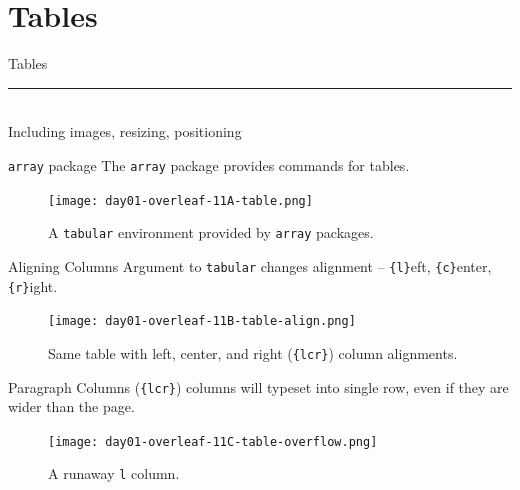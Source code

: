 \documentclass{beamer}
\begin{document}
{  

  \section{Tables}

  \begin{frame}[plain]
    \vfill
    \centering
    \begin{beamercolorbox}[sep=8pt,center,shadow=true,rounded=true]{Tables}
      \insertsectionhead\par%
      \color{davisblue}\noindent\rule{10cm}{1pt} \\
      \footnotesize{Including images, resizing, positioning}
    \end{beamercolorbox}
    \vfill
  \end{frame}

  \begin{frame}{\texttt{array} package}
    The \texttt{array} package provides commands for tables.
    \begin{figure}
      \texttt{[image: day01-overleaf-11A-table.png]}
      \caption{A \texttt{tabular} environment provided by \texttt{array} packages.}
      \label{fig:day01-overleaf-11A}
    \end{figure}
  \end{frame}

  \begin{frame}{Aligning Columns}
    Argument to \texttt{tabular} changes alignment -- \texttt{\{l\}}eft, \texttt{\{c\}}enter, \texttt{\{r\}}ight.
    \begin{figure}
      \texttt{[image: day01-overleaf-11B-table-align.png]}
      \caption{Same table with left, center, and right (\texttt{\{lcr\}}) column alignments.}
      \label{fig:day01-overleaf-11B}
    \end{figure}
  \end{frame}

  \begin{frame}{Paragraph Columns}
    (\texttt{\{lcr\}}) columns will typeset into single row, even if they are wider than the page.
    \begin{figure}
      \texttt{[image: day01-overleaf-11C-table-overflow.png]}
      \caption{A runaway \texttt{l} column.}
      \label{fig:day01-overleaf-11C}
    \end{figure}
  \end{frame}

}
\end{document}
